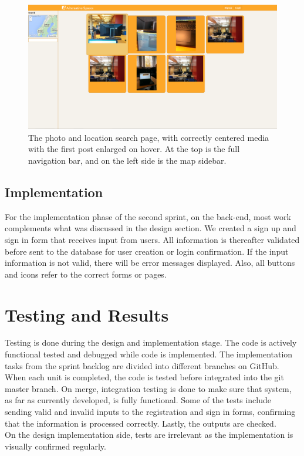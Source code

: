 \begin{figure}[ht!]
\centering
\includegraphics[width={\linewidth}]{Sprint2/img/Sprint2-PhotoPage.png}
\caption{The photo and location search page, with correctly centered media with the first post enlarged on hover. At the top is the full navigation bar, and on the left side is the map sidebar. \label{overflow}}
\end{figure}


\subsection{Implementation}
\label{subsec:S2DesignImplImpl}
For the implementation phase of the second sprint, on the back-end, most work complements what was discussed in the design section. We created a sign up and sign in form that receives input from users. All information is thereafter validated before sent to the database for user creation or login confirmation. If the input information is not valid, there will be error messages displayed. Also, all buttons and icons refer to the correct forms or pages. 

\section{Testing and Results}
\label{sec:S2Testing}
Testing is done during the design and implementation stage. The code is actively functional tested and debugged while code is implemented. The implementation tasks from the sprint backlog are divided into different branches on GitHub. When each unit is completed, the code is tested before integrated into the git master branch. On merge, integration testing is done to make sure that system, as far as currently developed, is fully functional. Some of the tests include sending valid and invalid inputs to the registration and sign in forms, confirming that the information is processed correctly. Lastly, the outputs are checked. \\
On the design implementation side, tests are irrelevant as the implementation is visually confirmed regularly. 


